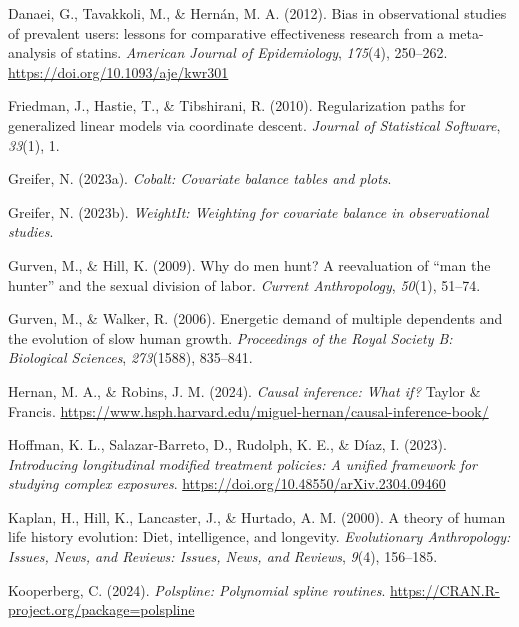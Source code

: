\documentclass[
  single column]{article}
\newlength{\cslhangindent}
\newenvironment{CSLReferences}[2] %
 {\begin{list}{}{%
  \setlength{\itemindent}{0pt}
  \setlength{\leftmargin}{0pt}
  \setlength{\parsep}{0pt}
  \ifodd #1
   \setlength{\leftmargin}{\cslhangindent}
   \setlength{\itemindent}{-1\cslhangindent}
  \fi
  \setlength{\itemsep}{#2\baselineskip}}}
 {\end{list}}
\begin{document}
\begin{CSLReferences}{1}{0}
Danaei, G., Tavakkoli, M., \& Hernán, M. A. (2012). Bias in
observational studies of prevalent users: lessons for comparative
effectiveness research from a meta-analysis of statins. \emph{American
Journal of Epidemiology}, \emph{175}(4), 250--262.
\url{https://doi.org/10.1093/aje/kwr301}

Friedman, J., Hastie, T., \& Tibshirani, R. (2010). Regularization paths
for generalized linear models via coordinate descent. \emph{Journal of
Statistical Software}, \emph{33}(1), 1.

Greifer, N. (2023a). \emph{Cobalt: Covariate balance tables and plots}.

Greifer, N. (2023b). \emph{WeightIt: Weighting for covariate balance in
observational studies}.

Gurven, M., \& Hill, K. (2009). Why do men hunt? A reevaluation of
{``man the hunter''} and the sexual division of labor. \emph{Current
Anthropology}, \emph{50}(1), 51--74.

Gurven, M., \& Walker, R. (2006). Energetic demand of multiple
dependents and the evolution of slow human growth. \emph{Proceedings of
the Royal Society B: Biological Sciences}, \emph{273}(1588), 835--841.

Hernan, M. A., \& Robins, J. M. (2024). \emph{Causal inference: What
if?} Taylor \& Francis.
\url{https://www.hsph.harvard.edu/miguel-hernan/causal-inference-book/}

Hoffman, K. L., Salazar-Barreto, D., Rudolph, K. E., \& Díaz, I. (2023).
\emph{Introducing longitudinal modified treatment policies: A unified
framework for studying complex exposures}.
\url{https://doi.org/10.48550/arXiv.2304.09460}

Kaplan, H., Hill, K., Lancaster, J., \& Hurtado, A. M. (2000). A theory
of human life history evolution: Diet, intelligence, and longevity.
\emph{Evolutionary Anthropology: Issues, News, and Reviews: Issues,
News, and Reviews}, \emph{9}(4), 156--185.

Kooperberg, C. (2024). \emph{Polspline: Polynomial spline routines}.
\url{https://CRAN.R-project.org/package=polspline}


\end{CSLReferences}
\end{document}
